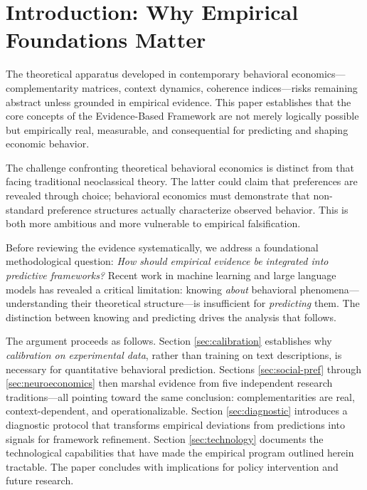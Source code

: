 \documentclass[12pt,oneside]{book}
\begin{document}
\newpage

\tableofcontents
\newpage

\chapter{Introduction: Why Empirical Foundations Matter}
\label{ch:intro}


The theoretical apparatus developed in contemporary behavioral economics—complementarity matrices,
context dynamics, coherence indices—risks remaining abstract unless grounded in empirical evidence.
This paper establishes that the core concepts of the Evidence-Based Framework are not merely
logically possible but empirically real, measurable, and consequential for predicting and
shaping economic behavior.

The challenge confronting theoretical behavioral economics is distinct from that facing traditional
neoclassical theory. The latter could claim that preferences are revealed through choice; behavioral
economics must demonstrate that non-standard preference structures actually characterize observed
behavior. This is both more ambitious and more vulnerable to empirical falsification.


Before reviewing the evidence systematically, we address a foundational methodological question:
\emph{How should empirical evidence be integrated into predictive frameworks?} Recent work in machine
learning and large language models has revealed a critical limitation: knowing \emph{about} behavioral
phenomena—understanding their theoretical structure—is insufficient for \emph{predicting} them. The
distinction between knowing and predicting drives the analysis that follows.

The argument proceeds as follows. Section \ref{sec:calibration} establishes why
\emph{calibration on experimental data}, rather than training on text descriptions, is necessary
for quantitative behavioral prediction. Sections \ref{sec:social-pref} through \ref{sec:neuroeconomics}
then marshal evidence from five independent research traditions—all pointing toward the same conclusion:
complementarities are real, context-dependent, and operationalizable. Section \ref{sec:diagnostic}
introduces a diagnostic protocol that transforms empirical deviations from predictions into signals
for framework refinement. Section \ref{sec:technology} documents the technological capabilities that
have made the empirical program outlined herein tractable. The paper concludes with implications
for policy intervention and future research.
\end{document}
